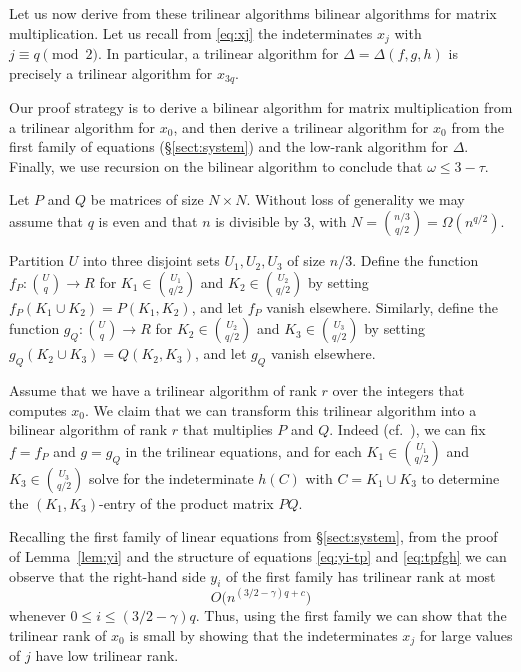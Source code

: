 \documentclass{amsart}
\begin{document}
Let us now derive from these trilinear algorithms
bilinear algorithms for matrix multiplication.
Let us recall from \eqref{eq:xj} the indeterminates $x_j$ 
with $j\equiv q\pmod 2$. In particular, a trilinear algorithm
for $\Delta=\Delta(f,g,h)$ is precisely a trilinear algorithm for $x_{3q}$.

Our proof strategy is to derive a bilinear algorithm for matrix
multiplication from a trilinear algorithm for $x_0$, and then
derive a trilinear algorithm for $x_0$ from the first family 
of equations (\S\ref{sect:system}) and the low-rank algorithm 
for $\Delta$. Finally, we use recursion on the bilinear algorithm
to conclude that $\omega\leq 3-\tau$.

Let $P$ and $Q$ be matrices of size $N\times N$. 
Without loss of generality we may assume that $q$ is even and 
that $n$ is divisible by 3, with $N=\binom{n/3}{q/2}=\Omega(n^{q/2})$. 

Partition $U$ into three disjoint sets $U_1,U_2,U_3$ of size $n/3$.
Define the function $f_P:\binom{U}{q}\rightarrow R$ for 
$K_1\in\binom{U_1}{q/2}$ and $K_2\in\binom{U_2}{q/2}$
by setting $f_P(K_1\cup K_2)=P(K_1,K_2)$, and let $f_P$ vanish
elsewhere.
Similarly, define the function $g_Q:\binom{U}{q}\rightarrow R$ for 
$K_2\in\binom{U_2}{q/2}$ and $K_3\in\binom{U_3}{q/2}$
by setting $g_Q(K_2\cup K_3)=Q(K_2,K_3)$, and let $g_Q$ vanish
elsewhere.

Assume that we have a trilinear algorithm of rank $r$ over the integers 
that computes $x_0$. We claim that we can transform this trilinear 
algorithm into a bilinear algorithm of rank $r$ that multiplies $P$ and $Q$. 
Indeed (cf.~\cite[\S9]{Pan1984}), we can fix $f=f_P$ and $g=g_Q$ in 
the trilinear equations, and for each $K_1\in\binom{U_1}{q/2}$ and 
$K_3\in\binom{U_3}{q/2}$ solve for the indeterminate $h(C)$ with 
$C=K_1\cup K_3$ to determine the $(K_1,K_3)$-entry of the product 
matrix $PQ$.

Recalling the first family of linear equations from \S\ref{sect:system},
from the proof of Lemma~\ref{lem:yi} and the structure of 
equations \eqref{eq:yi-tp} and \eqref{eq:tpfgh} we can observe 
that the right-hand side $y_i$ of the first family has trilinear
rank at most 
\begin{equation}
\label{eq:yi-trilinear}
O\bigl(n^{(3/2-\gamma)q+c}\bigr)
\end{equation}
whenever $0\leq i\leq (3/2-\gamma)q$.
Thus, using the first family we can show that the trilinear rank 
of $x_0$ is small by showing that the indeterminates $x_j$ for 
large values of $j$ have low trilinear rank.
\end{document}
